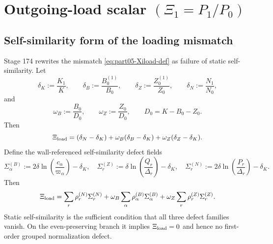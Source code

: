 
\section{Outgoing-load scalar \texorpdfstring{\((\Xi_1=P_1/P_0)\)}{(Xi1=P1/P0)}}
\label{sec:part05_weak_axisymmetric_orbit:outgoing-load-scalar-xi-1-p-1-p-0}

\subsection{Self-similarity form of the loading mismatch}
Stage 174 rewrites the mismatch \eqref{eq:part05-Xiload-def} as failure of static self-similarity.  Let
\begin{equation}
\label{eq:part05-static-slope-defs}
\delta_K:=\frac{K_1}{K},
\qquad
\delta_B:=\frac{B_0^{(1)}}{B_0},
\qquad
\delta_Z:=\frac{Z_0^{(1)}}{Z_0},
\qquad
\delta_N:=\frac{N_1}{N_0},
\end{equation}
and
\begin{equation}
\label{eq:part05-weights-static}
\omega_B:=\frac{B_0}{D_0},
\qquad
\omega_Z:=\frac{Z_0}{D_0},
\qquad
D_0=K-B_0-Z_0.
\end{equation}
Then
\begin{equation}
\label{eq:part05-Xiload-selfsimilarity}
\Xi_{\rm load}
=
(\delta_N-\delta_K)
+\omega_B(\delta_B-\delta_K)
+\omega_Z(\delta_Z-\delta_K).
\end{equation}
Define the wall-referenced self-similarity defect fields
\begin{equation}
\label{eq:part05-Sigma-self-fields}
\Sigma_\alpha^{(B)}:=2\delta\ln\!\left(\frac{c_\alpha}{\varpi_\alpha}\right)-\delta_K,
\quad
\Sigma_r^{(Z)}:=\delta\ln\!\left(\frac{Q_r}{\Delta_r}\right)-\delta_K,
\quad
\Sigma_r^{(N)}:=2\delta\ln\!\left(\frac{P_r}{\Delta_r}\right)-\delta_K.
\end{equation}
Then
\begin{equation}
\label{eq:part05-Xiload-Sigma-fields}
\Xi_{\rm load}
=
\sum_r\rho_r^{(N)}\Sigma_r^{(N)}
+
\omega_B\sum_\alpha\rho_\alpha^{(B)}\Sigma_\alpha^{(B)}
+
\omega_Z\sum_r\rho_r^{(Z)}\Sigma_r^{(Z)}.
\end{equation}
Static self-similarity is the sufficient condition that all three defect families vanish.  On the even-preserving branch it implies \(\Xi_{\rm load}=0\) and hence no first-order grouped normalization defect.

